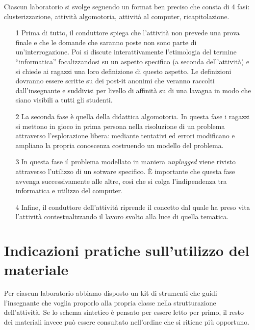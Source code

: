 \documentclass[12pt]{article}
\begin{document}
Ciascun laboratorio si svolge seguendo un format ben preciso che consta di 4 fasi: clusterizzazione, attività algomotoria, attività al computer, ricapitolazione.

\begin{enumerate}
\item[1]
Prima di tutto, il conduttore spiega che l'attività non prevede una prova finale e che le domande che saranno poste non sono parte di un'interrogazione. Poi si discute interattivamente l'etimologia del termine ``informatica'' focalizzandosi su un aspetto specifico (a seconda dell'attività) e si chiede ai ragazzi una loro definizione di questo aspetto. Le definizioni dovranno essere scritte su dei post-it anonimi che veranno raccolti dall'insegnante e suddivisi per livello di affinità su di una lavagna in modo che siano visibili a tutti gli studenti.
\item[2]
La seconda fase è quella della didattica algomotoria. In questa fase i ragazzi si mettono in gioco in prima persona nella risoluzione di un problema attraverso l'esplorazione libera: mediante tentativi ed errori modificano e ampliano la propria conoscenza costruendo un modello del problema.
\item[3]
In questa fase il problema modellato in maniera \emph{unplugged} viene rivisto attraverso l'utilizzo di un sotware specifico. È importante che questa fase avvenga successivamente alle altre, così che si colga l'indipendenza tra informatica e utilizzo del computer.
\item[4]
Infine, il conduttore dell'attività riprende il concetto dal quale ha preso vita l'attività contestualizzando il lavoro svolto alla luce di quella tematica.
\end{enumerate}
%
%
\section{Indicazioni pratiche sull’utilizzo del materiale}
Per ciascun laboratorio abbiamo disposto un kit di strumenti che guidi l'insegnante che voglia proporlo alla propria classe nella strutturazione dell'attività. Se lo schema sintetico è pensato per essere letto per primo, il resto dei materiali invece può essere consultato nell'ordine che si ritiene più opportuno.
\end{document}
